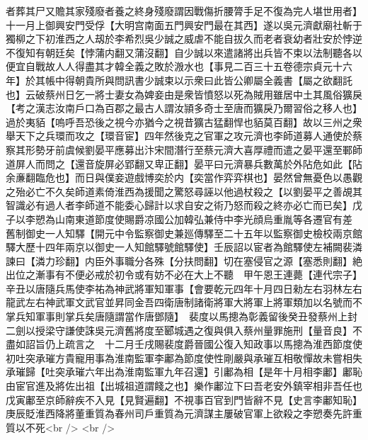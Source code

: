 者葬其尸又贍其家殘廢者養之終身殘廢謂因戰傷折腰膂手足不復為完人堪世用者】十一月上御興安門受俘【大明宫南面五門興安門最在其西】遂以吳元濟獻廟社斬于獨柳之下初淮西之人刼於李希烈吳少誠之威虐不能自拔久而老者衰幼者壯安於悖逆不復知有朝廷矣【悖蒲内翻又蒲沒翻】自少誠以來遣諸將出兵皆不束以法制聽各以便宜自戰故人人得盡其才韓全義之敗於溵水也【事見二百三十五卷德宗貞元十六年】於其帳中得朝貴所與問訊書少誠束以示衆曰此皆公卿屬全義書【屬之欲翻託也】云破蔡州日乞一將士妻女為婢妾由是衆皆憤怒以死為賊用雖居中土其風俗獷戾【考之漢志汝南戶口為百郡之最古人謂汝頴多奇士至唐而獷戾乃爾習俗之移人也】過於夷貊【嗚呼吾恐後之視今亦猶今之視昔獷古猛翻悍也貊莫百翻】故以三州之衆舉天下之兵環而攻之【環音宦】四年然後克之官軍之攻元濟也李師道募人通使於蔡察其形勢牙前虞候劉晏平應募出汴宋間潛行至蔡元濟大喜厚禮而遣之晏平還至鄆師道屏人而問之【還音旋屏必郢翻又卑正翻】晏平曰元濟暴兵數萬於外阽危如此【阽余亷翻臨危也】而日與僕妾遊戲博奕於内【奕當作弈弈棋也】晏然曾無憂色以愚觀之殆必亡不久矣師道素倚淮西為援聞之驚怒尋誣以他過杖殺之【以劉晏平之善覘其智識必有過人者李師道不能委心歸計以求自安之術乃怒而殺之終亦必亡而已矣】戊子以李愬為山南東道節度使賜爵凉國公加韓弘兼侍中李光顔烏重胤等各遷官有差　舊制御史一人知驛【開元中令監察御史兼廵傳驛至二十五年以監察御史檢校兩京館驛大歷十四年兩京以御史一人知館驛號館驛使】壬辰詔以宦者為館驛使左補闕裴潾諫曰【潾力珍翻】内臣外事職分各殊【分扶問翻】切在塞侵官之源【塞悉則翻】絶出位之漸事有不便必戒於初令或有妨不必在大上不聽　甲午恩王連薨【連代宗子】　辛丑以唐隨兵馬使李祐為神武將軍知軍事【會要乾元四年十月四日勑左右羽林左右龍武左右神武軍文武官並昇同金吾四衛唐制諸衛將軍大將軍上將軍類加以名號而不掌兵知軍事則掌兵矣唐隨謂當作唐鄧隨】　裴度以馬摠為彰義留後癸丑發蔡州上封二劍以授梁守謙使誅吳元濟舊將度至郾城遇之復與俱入蔡州量罪施刑【量音良】不盡如詔旨仍上疏言之　十二月壬戌賜裴度爵晉國公復入知政事以馬摠為淮西節度使　初吐突承璀方貴寵用事為淮南監軍李鄘為節度使性剛嚴與承璀互相敬憚故未嘗相失承璀歸【吐突承璀六年出為淮南監軍九年召還】引鄘為相【是年十月相李鄘】鄘恥由宦官進及將佐出祖【出城祖道謂餞之也】樂作鄘泣下曰吾老安外鎮宰相非吾任也戊寅鄘至京師辭疾不入見【見賢遍翻】不視事百官到門皆辭不見【史言李鄘知恥】　庚辰貶淮西降將董重質為春州司戶重質為元濟謀主屢破官軍上欲殺之李愬奏先許重質以不死<br />
<br />
